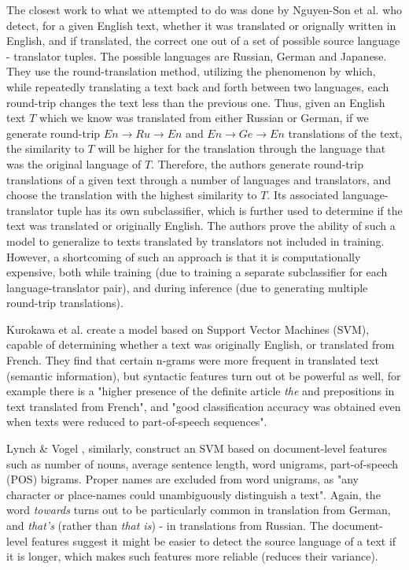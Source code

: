 \documentclass[twocolumn]{article}
\begin{document}
The closest work to what we attempted to do was done by Nguyen-Son et al. \cite{roundtrip} who detect, for a given English text, whether it was translated or orignally written in English, and if translated, the correct one out of a set of possible source language - translator tuples. The possible languages are Russian, German and Japanese. They use the round-translation method, utilizing the phenomenon by which, while repeatedly translating a text back and forth between two languages, each round-trip changes the text less than the previous one. Thus, given an English text $T$ which we know was translated from either Russian or German, if we generate round-trip $En \rightarrow Ru \rightarrow En$ and $En \rightarrow Ge \rightarrow En$ translations of the text, the similarity to $T$ will be higher for the translation through the language that was the original language of $T$. Therefore, the authors generate round-trip translations of a given text through a number of languages and translators, and choose the translation with the highest similarity to $T$. Its associated language-translator tuple has its own subclassifier, which is further used to determine if the text was translated or originally English. The authors prove the ability of such a model to generalize to texts translated by translators not included in training. However, a shortcoming of such an approach is that it is computationally expensive, both while training (due to training a separate subclassifier for each language-translator pair), and during inference (due to generating multiple round-trip translations).

Kurokawa et al. \cite{canada} create a model based on Support Vector Machines (SVM), capable of determining whether a text was originally English, or translated from French. They find that certain n-grams were more frequent in translated text (semantic information), but syntactic features turn out ot be powerful as well, for example there is a "higher presence of the definite article \emph{the} and prepositions in text translated from French", and "good classification accuracy was obtained even when texts were reduced to part-of-speech sequences".

Lynch \& Vogel \cite{literary}, similarly, construct an SVM based on document-level features such as number of nouns, average sentence length, word unigrams, part-of-speech (POS) bigrams. Proper names are excluded from word unigrams, as "any character or place-names could unambiguously distinguish a text". Again, the word \emph{towards} turns out to be particularly common in translation from German, and \emph{that's} (rather than \emph{that is}) - in translations from Russian. The document-level features suggest it might be easier to detect the source language of a text if it is longer, which makes such features more reliable (reduces their variance).
\end{document}
